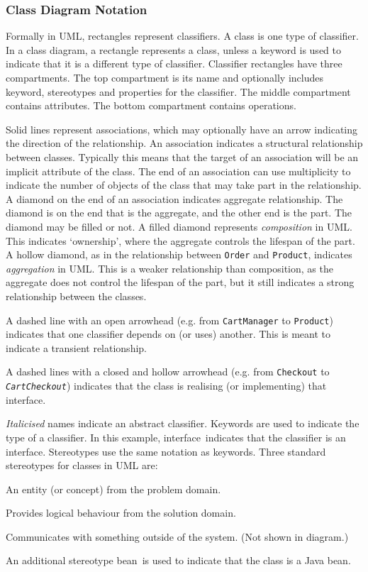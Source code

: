 \subsubsection{Class Diagram Notation}\label{sec:classNotation}
Formally in UML, rectangles represent classifiers. A class is one type of classifier.
In a class diagram, a rectangle represents a class, unless a keyword is used to indicate that it is a different type of classifier.
Classifier rectangles have three compartments.
The top compartment is its name and optionally includes keyword, stereotypes and properties for the classifier.
The middle compartment contains attributes.
The bottom compartment contains operations.

Solid lines represent associations, which may optionally have an arrow indicating the direction of the relationship.
An association indicates a structural relationship between classes.
Typically this means that the target of an association will be an implicit attribute of the class.
The end of an association can use multiplicity to indicate the number of objects of the class that may take part in the relationship.
A diamond on the end of an association indicates aggregate relationship.
The diamond is on the end that is the aggregate, and the other end is the part.
The diamond may be filled or not. A filled diamond represents \emph{composition} in UML.
This indicates `ownership', where the aggregate controls the lifespan of the part.
A hollow diamond, as in the relationship between \texttt{Order} and \texttt{Product},
indicates \emph{aggregation} in UML.
This is a weaker relationship than composition, as the aggregate does not control the lifespan of the part,
but it still indicates a strong relationship between the classes.

A dashed line with an open arrowhead (e.g. from \texttt{CartManager} to \texttt{Product})
indicates that one classifier depends on (or uses) another. This is meant to indicate a transient relationship.

A dashed lines with a closed and hollow arrowhead (e.g. from \texttt{Checkout} to \texttt{\textsl{CartCheckout}})
indicates that the class is realising (or implementing) that interface.

\textit{Italicised} names indicate an abstract classifier. Keywords are used to indicate the type of a classifier.
In this example, \guillemotleft interface\guillemotright~indicates that the classifier is an interface.
Stereotypes use the same notation as keywords. Three standard stereotypes for classes in UML are:
\begin{description}[nosep,left=5mm]
    \item[\guillemotleft entity\guillemotright] An entity (or concept) from the problem domain.
    \item[\guillemotleft control\guillemotright] Provides logical behaviour from the solution domain.
    \item[\guillemotleft boundary\guillemotright] Communicates with something outside of the system. (Not shown in diagram.)
\end{description}
An additional stereotype \guillemotleft bean\guillemotright~is used to indicate that the class is a Java bean.

